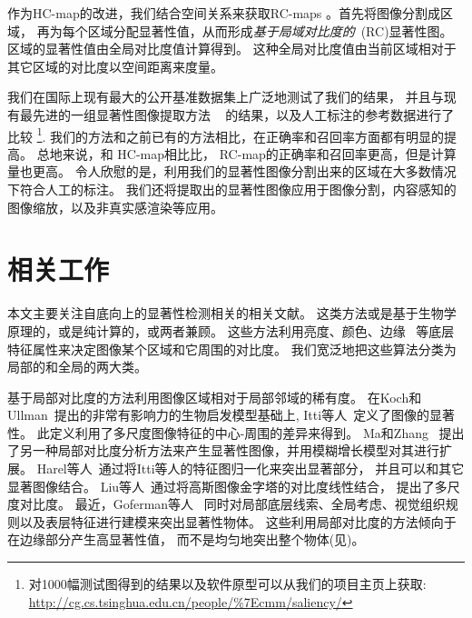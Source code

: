 \documentclass[final]{cvpr}
\newcommand{\RC}{RC-maps }
\begin{document}
作为HC-map的改进，我们结合空间关系来获取\RC 。首先将图像分割成区域，
再为每个区域分配显著性值，从而形成\emph{基于局域对比度的}~(RC)显著性图。
区域的显著性值由全局对比度值计算得到。
这种全局对比度值由当前区域相对于其它区域的对比度以空间距离来度量。


我们在国际上现有最大的公开基准数据集上广泛地测试了我们的结果，
并且与现有最先进的一组显著性图像提取方法
~\cite{98pami/Itti,03ACMMM/Ma_Contrast-based,06acmmm/ZhaiS_spatiotemporal,conf/nips/HarelKP06,07cvpr/hou_SpectralResidual,08cvs/achanta_salient,09cvpr/Achanta_FTSaliency,10cvpr/goferman_context}
的结果，以及人工标注的参考数据进行了比较
\footnote{对1000幅测试图得到的结果以及软件原型可以从我们的项目主页上获取:
\href{http://cg.cs.tsinghua.edu.cn/people/~cmm/saliency/}
{http://cg.cs.tsinghua.edu.cn/people/\%7Ecmm/saliency/}}.
我们的方法和之前已有的方法相比，在正确率和召回率方面都有明显的提高。
总地来说，和 HC-map相比比， RC-map的正确率和召回率更高，但是计算量也更高。
令人欣慰的是，利用我们的显著性图像分割出来的区域在大多数情况下符合人工的标注。
我们还将提取出的显著性图像应用于图像分割，内容感知的图像缩放，以及非真实感渲染等应用。


\section{相关工作}
\label{sec:RelatedWorks}

本文主要关注自底向上的显著性检测相关的相关文献。
这类方法或是基于生物学原理的，或是纯计算的，或两者兼顾。
这些方法利用亮度、颜色、边缘~\cite{09cvpr/Achanta_FTSaliency}
等底层特征属性来决定图像某个区域和它周围的对比度。
我们宽泛地把这些算法分类为局部的和全局的两大类。

基于局部对比度的方法利用图像区域相对于局部邻域的稀有度。
在Koch和Ullman~\cite{85HN/KochVisualAttention}提出的非常有影响力的生物启发模型基础上,
Itti等人~\cite{98pami/Itti}定义了图像的显著性。
此定义利用了多尺度图像特征的中心-周围的差异来得到。
Ma和Zhang~\cite{03ACMMM/Ma_Contrast-based}
提出了另一种局部对比度分析方法来产生显著性图像，并用模糊增长模型对其进行扩展。
Harel等人~\cite{conf/nips/HarelKP06}通过将Itti等人的特征图归一化来突出显著部分，
并且可以和其它显著图像结合。
Liu等人~\cite{10pami/Liu_Learning}通过将高斯图像金字塔的对比度线性结合，
提出了多尺度对比度。
最近，Goferman等人~\cite{10cvpr/goferman_context}
同时对局部底层线索、全局考虑、视觉组织规则以及表层特征进行建模来突出显著性物体。
这些利用局部对比度的方法倾向于在边缘部分产生高显著性值，
而不是均匀地突出整个物体(见)。
\end{document}
